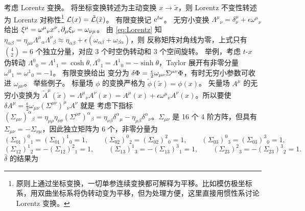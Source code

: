 考虑 Lorentz 变换。
将坐标变换转述为主动变换 $x\to\tilde x$，则 Lorentz 不变性转述为 Lorentz 对称性\footnote{原则上通过坐标变换，一切单参连续变换都可解释为平移。比如模仿极坐标系，用双曲坐标系将伪转动变为平移，但为处理方便，这里直接用惯性系讨论Lorentz 变换。} $\mathcal{L}(x)=\tilde{\mathcal{L}}(\tilde x)$。
有限变换记 $\mathrm{e}^{t\omega}$。
无穷小变换 $\Lambda^\mu{}_\nu = \delta^\mu_\nu + \epsilon\omega^\mu{}_\nu$ 给出 $\xi^\mu = \omega^\mu{}_\nu x^\nu,\partial_\mu\xi_\nu = \omega_{\nu\mu}$。
由 \eqref{eq:Lorentz} 知 ${\eta}_{\alpha\beta}=\eta_{\mu\nu}\Lambda^{\mu}{}_{\alpha}{\Lambda^{\nu}}_{\beta}\approx \eta_{\alpha\beta} + \epsilon(\omega_{\alpha\beta} + \omega_{\beta\alpha})$，则
反称矩阵对角线为零，上式只有 $\binom{4}{2} = 6$ 个独立分量，对应 3 个时空伪转动和 3 个空间旋转。
举例，考虑 $t$-$x$ 伪转动 $\Lambda^0{}_0 = \Lambda^1{}_1 = \cosh\theta,\Lambda^0{}_1 = \Lambda^1{}_0 = -\sinh\theta$，Taylor 展开有非零分量 $\omega^{0}{}_{1}=\omega^{1}{}_{0}=-1$。
有限变换给出
变分为 $\var\Phi = \frac \epsilon 2 \omega_{\mu\nu} \Sigma^{\mu\nu} \Phi$，有时无穷小参数可收进 $\omega_{\mu\nu}$。
举些例子。
标量场 $\phi$ 的变换严格为 $\tilde\phi(\tilde x)=\phi(x)$。
矢量场 $A^\mu$ 的无穷小变换为 $\tilde A^\mu(\tilde x) = \Lambda^\mu{}_\nu A^\nu(x) = A^\mu(x) + \epsilon\omega^\mu{}_\nu A^\nu(x)$。所以要使 $\delta A^\mu = \frac \epsilon 2 \omega_{\mu\nu} (\Sigma^{\mu\nu})^\mu{}_\nu A^\nu$ 就是
\eq{
    \omega^\alpha{}_\beta = \eta^{\alpha\mu}\omega_{\mu\nu} \delta^\nu{}_\beta = \frac 12 \omega_{\mu\nu} (\Sigma^{\mu\nu})^\alpha{}_\beta ,\quad (\Sigma^{\mu\nu})^\alpha{}_\beta := 2\eta^{\alpha[\mu}\delta^{\nu]}{}_\beta,
}
考虑下指标 $(\Sigma_{\mu\nu})^\alpha{}_\beta
=\eta_{\mu\rho}\eta_{\nu\sigma}(\Sigma^{\rho\sigma})^\alpha{}_\beta
=\eta_{\nu\beta}\delta^\alpha{}_\mu-\eta_{\mu\beta}\delta^\alpha{}_\nu$。$\Sigma_{\mu\nu}$ 是 16 个 4 阶方阵，但具有 $\Sigma_{\mu\nu}=-\Sigma_{\nu\mu}$，因此独立矩阵为 6 个，非零分量为
\[
(\Sigma_{01})^0{}_1 = (\Sigma_{01})^1{}_0 = 1,
\qquad
(\Sigma_{02})^0{}_2 = (\Sigma_{02})^2{}_0 = 1,
\qquad
(\Sigma_{03})^0{}_3 = (\Sigma_{03})^3{}_0 = 1,
\]
\[
(\Sigma_{12})^1{}_2 = -(\Sigma_{12})^2{}_1 = 1,
\qquad
(\Sigma_{13})^1{}_3 = -(\Sigma_{13})^3{}_1 = 1,
\qquad
(\Sigma_{23})^2{}_3 = -(\Sigma_{23})^3{}_2 = 1.
\]
$\bar\delta$ 的结果为
